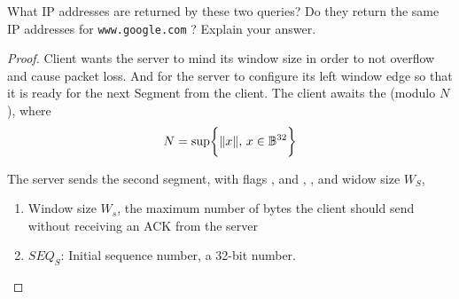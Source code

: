 \documentclass[../../main.tex]{subfiles}
\begin{document}
\begin{wts}
What IP addresses are returned by these two queries? Do they return the same IP addresses for \lstinline{www.google.com} ? Explain your answer.
\end{wts}
\begin{proof}
Client wants the server to mind its window size in order to not overflow and cause packet loss. 
And for the server to configure its left window edge so that it is ready for the next Segment from the client. The client awaits the  (modulo $N$), where
\begin{equation}\label{mod n}
N = \sup\biggl\{\lVert {x} \rVert,\,x\in\mathbb{B}^{32}\biggr\}\end{equation}

The server sends the second segment, with flags , and , , and widow size $W_S$,
\begin{enumerate}
    \item Window size $W_s$, the maximum number of bytes the client should send without receiving an ACK from the server
    \item $SEQ_S$: Initial sequence number, a 32-bit number.
\end{enumerate} 
\end{proof}
\end{document}
